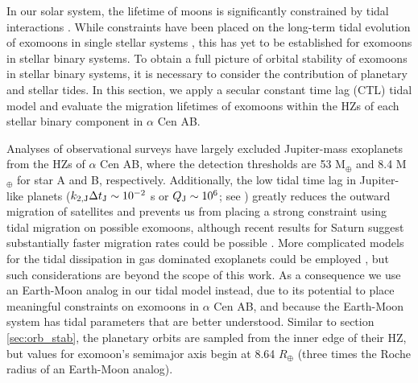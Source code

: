 \documentclass[preprint]{aastex63}
\begin{document}
In our solar system, the lifetime of moons is significantly constrained by tidal interactions \citep{Barnes2002, Sucerquia2019, lainey2020resonance}. While constraints have been placed on the long-term tidal evolution of exomoons in single stellar systems \citep{Sasaki2012, Sasaki2014}, this has yet to be established for exomoons in stellar binary systems.  To obtain a full picture of orbital stability of exomoons in stellar binary systems, it is necessary to consider the contribution of planetary and stellar tides.  In this section, we apply a secular constant time lag (CTL) tidal model and evaluate the migration lifetimes of exomoons within the HZs of each stellar binary component in $\alpha$ Cen AB. 

Analyses of observational surveys \citep{Zhao2018} have largely excluded Jupiter-mass exoplanets from the HZs of $\alpha$ Cen AB, where the detection thresholds are 53 M$_\oplus$ and 8.4 M$_\oplus$ for star A and B, respectively.  Additionally, {the low tidal time lag in Jupiter-like planets ($k_{\rm 2,J}\Delta t_{\rm J} \sim 10^{-2}$ s or $Q_{\rm J} \sim 10^6$; see \cite{Leconte2010}) greatly reduces the outward migration of satellites and prevents us from placing a strong constraint using tidal migration on possible exomoons}, although recent results for Saturn suggest substantially faster migration rates could be possible \citep{lainey2020resonance}. {More complicated models for the tidal dissipation in gas dominated exoplanets could be employed \citep[e.g.,][]{Guenel2014,AlvaradoMontes2017}, but such considerations are beyond the scope of this work.}
As a consequence we use an Earth-Moon analog in our tidal model instead, due to its potential to place meaningful constraints on exomoons in $\alpha$ Cen AB, and because the Earth-Moon system has tidal parameters that are better understood.  Similar to section \ref {sec:orb_stab}, the planetary orbits are sampled from the inner edge of their HZ, but values for exomoon's semimajor axis begin at 8.64 $R_\oplus$ (three times the Roche radius of an Earth-Moon analog). 
\end{document}
